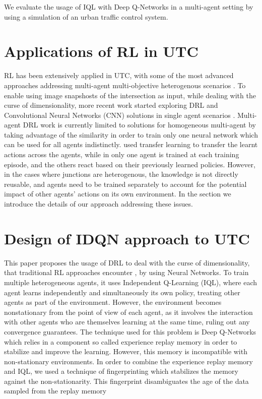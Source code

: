 \documentclass{llncs}
\begin{document}
We evaluate the usage of IQL with Deep Q-Networks in a multi-agent setting by using a simulation of an urban traffic control system.


\section{Applications of RL in UTC}

RL has been extensively applied in UTC, with some of the most advanced approaches addressing multi-agent multi-objective heterogenous scenarios \cite{Dusparic2016, El-Tantawy2012}. To enable using image snapshosts of the intersection as input, while dealing with the curse of dimensionality, more recent work started exploring DRL and Convolutional Neural Networks (CNN) solutions in single agent scenarios \cite{Mousavi2017,Liang2018}. Multi-agent DRL work is currently limited to solutions for homogeneous multi-agent by taking advantage of the similarity in order to train only one neural network which can be used for all agents indistinctly.\cite{VanDerPol2016} used transfer learning to transfer the learnt actions across the agents, while in \cite{Liu2017CooperativeDR} only one agent is trained at each training episode, and the others react based on their previously learned policies. However, in the cases where junctions are heterogenous, the knowledge is not directly reusable, and agents need to be trained separately to account for the potential impact of other agents' actions on its own environment. In the section we introduce the details of our approach addressing these issues. 

\section{Design of IDQN approach to UTC}

This paper proposes the usage of DRL to deal with the curse of dimensionality, that traditional RL approaches encounter , by using Neural Networks. To train multiple heterogeneous agents, it uses Independent Q-Learning (IQL), where each agent learns independently and simultaneously its own policy, treating other agents as part of the environment. However, the environment becomes nonstationary from the point of view of each agent, as it involves the interaction with other agents who are themselves learning at the same time, ruling out any convergence guarantees. The technique used for this problem is Deep Q-Networks which relies in a component so called experience replay memory in order to stabilize and improve the learning. However, this memory is incompatible with non-stationary environments. In order to combine the experience replay memory and IQL, we used a technique of fingerprinting which stabilizes the memory against the non-stationarity. This fingerprint disambiguates the age of the data sampled from the replay memory
\end{document}
